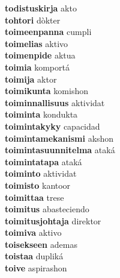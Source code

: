 \textbf{todistuskirja } akto \\
\textbf{tohtori } dòkter \\
\textbf{toimeenpanna } cumpli \\
\textbf{toimelias } aktivo \\
\textbf{toimenpide } aktua \\
\textbf{toimia } komportá \\
\textbf{toimija } aktor \\
\textbf{toimikunta } komishon \\
\textbf{toiminnallisuus } aktividat \\
\textbf{toiminta } kondukta \\
\textbf{toimintakyky } capacidad \\
\textbf{toimintamekanismi } akshon \\
\textbf{toimintasuunnitelma } ataká \\
\textbf{toimintatapa } ataká \\
\textbf{toiminto } aktividat \\
\textbf{toimisto } kantoor \\
\textbf{toimittaa } trese \\
\textbf{toimitus } abasteciendo \\
\textbf{toimitusjohtaja } direktor \\
\textbf{toimiva } aktivo \\
\textbf{toisekseen } ademas \\
\textbf{toistaa } dupliká \\
\textbf{toive } aspirashon \\
